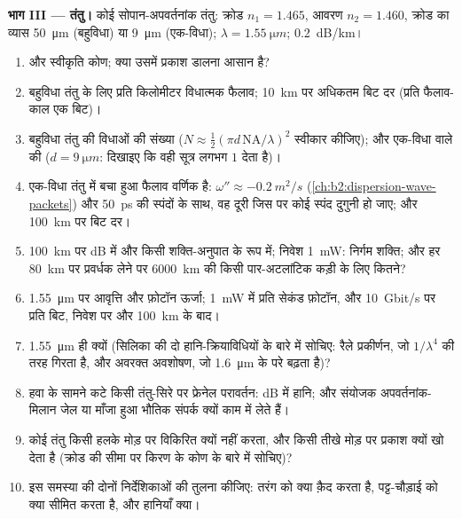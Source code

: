 \begin{problem}
\medskip
\noindent\textbf{भाग III --- तंतु।}
कोई सोपान-अपवर्तनांक तंतु: क्रोड $n_1 = 1.465$, आवरण $n_2 = 1.460$, क्रोड
का व्यास \qty{50}{\micro m} (बहुविधा) या \qty{9}{\micro m} (एक-विधा);
$\lambda = \qty{1.55}{\micro m}$;  \qty{0.2}{dB/km}।
\begin{enumerate}[resume]
  \item {} और स्वीकृति कोण; क्या उसमें प्रकाश डालना
        आसान है?
  \item बहुविधा तंतु के लिए प्रति किलोमीटर विधात्मक फैलाव; \qty{10}{km}
        पर अधिकतम बिट दर (प्रति फैलाव-काल एक बिट)।
  \item बहुविधा तंतु की विधाओं की संख्या ($N \approx
        \tfrac12(\pi d\,\mathrm{NA}/\lambda)^2$ स्वीकार कीजिए); और एक-विधा वाले की ($d =
        \qty{9}{\micro m}$: दिखाइए कि वही सूत्र लगभग $1$ देता है)।
  \item एक-विधा तंतु में बचा हुआ फैलाव वर्णिक है:
        $\omega'' \approx \qty{-0.2}{m^2/s}$ (\cref{ch:b2:dispersion-wave-packets})
        और \qty{50}{ps} की स्पंदों के साथ, वह दूरी जिस पर कोई स्पंद दुगुनी हो
        जाए; और \qty{100}{km} पर बिट दर।
  \item \qty{100}{km} पर  dB में और किसी शक्ति-अनुपात के रूप में;
        निवेश \qty{1}{mW}: निर्गम शक्ति; और हर \qty{80}{km} पर प्रवर्धक लेने पर
        \qty{6000}{km} की किसी पार-अटलांटिक कड़ी के लिए कितने?
  \item \qty{1.55}{\micro m} पर आवृत्ति और फ़ोटॉन ऊर्जा; \qty{1}{mW} में प्रति
        सेकंड फ़ोटॉन, और \qty{10}{Gbit/s} पर प्रति बिट, निवेश पर
        और \qty{100}{km} के बाद।
  \item \qty{1.55}{\micro m} ही क्यों (सिलिका की दो हानि-क्रियाविधियों के बारे
        में सोचिए: रैले प्रकीर्णन, जो $1/\lambda^4$ की तरह गिरता है, और अवरक्त
        अवशोषण, जो \qty{1.6}{\micro m} के परे बढ़ता है)?
  \item हवा के सामने कटे किसी तंतु-सिरे पर फ्रेनेल परावर्तन: dB में
        हानि; और संयोजक अपवर्तनांक-मिलान जेल या माँजा हुआ भौतिक
        संपर्क क्यों काम में लेते हैं।
  \item कोई तंतु किसी हलके मोड़ पर विकिरित क्यों नहीं करता, और किसी
        तीखे मोड़ पर प्रकाश क्यों खो देता है (क्रोड की सीमा पर किरण
        के कोण के बारे में सोचिए)?
  \item इस समस्या की दोनों निर्देशिकाओं की तुलना कीजिए: तरंग को क्या
        क़ैद करता है, पट्ट-चौड़ाई को क्या सीमित करता है, और हानियाँ क्या।
\end{enumerate}
\end{problem}
